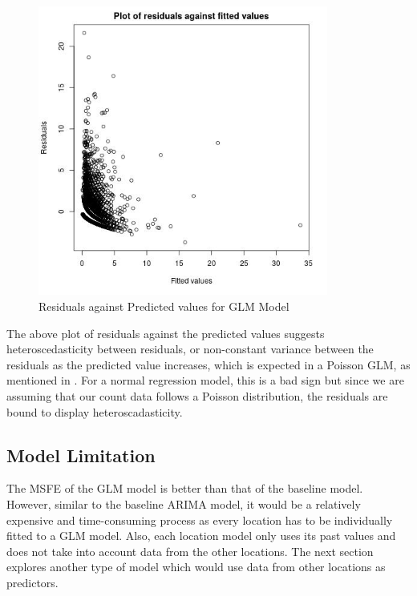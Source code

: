 \documentclass[12pt, letterpaper] {article}
\begin{document}
\begin{figure}[H]
    \centering
    \includegraphics[width=0.85\textwidth, height=0.6\textheight]{Images/Full_GLM_resids_vs_fitted.jpg}
    \caption{Residuals against Predicted values for GLM Model}
    \label{fig:Residuals against Predicted values for GLM Model}
\end{figure}

\noindent The above plot of residuals against the predicted values suggests heteroscedasticity between residuals, or non-constant variance between the residuals as the predicted value increases, which is expected in a Poisson GLM, as mentioned in \cite{Dylan2017}. For a normal regression model, this is a bad sign but since we are assuming that our count data follows a Poisson distribution, the residuals are bound to display heteroscadasticity. 

\subsection{Model Limitation}

The MSFE of the GLM model is better than that of the baseline model. However, similar to the baseline ARIMA model, it would be a relatively expensive and time-consuming process as every location has to be individually fitted to a GLM model. Also, each location model only uses its past values and does not take into account data from the other locations. The next section explores another type of model which would use data from other locations as predictors. 
\end{document}

